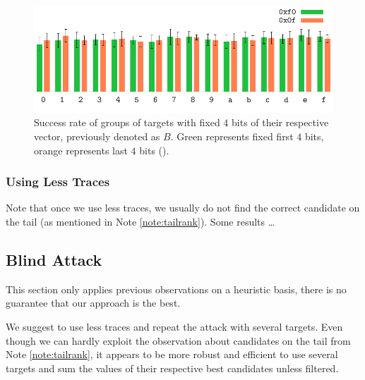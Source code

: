 	\begin{figure}[h]
	\begin{center}
		\includegraphics{figures/leak_target_other/leak_0x0f_0xf0.pdf}
		\caption{Success rate of groups of targets with fixed $4$ bits of their respective vector, previously denoted as $B$. Green represents fixed first $4$ bits, orange represents last $4$ bits ().}
		\label{fig:leaktargethist}
	\end{center}
	\end{figure}

\subsubsection{Using Less Traces}
	
	Note that once we use less traces, we usually do not find the correct candidate on the tail (as mentioned in Note \ref{note:tailrank}). Some results \ldots %



\subsection{Blind Attack}
\label{sec:subblindattack}

\begin{note}
	This section only applies previous observations on a heuristic basis, there is no guarantee that our approach is the best.
\end{note}

We suggest to use less traces and repeat the attack with several targets. Even though we can hardly exploit the observation about candidates on the tail from Note \ref{note:tailrank}, it appears to be more robust and efficient to use several targets and sum the values of their respective best candidates unless filtered.

